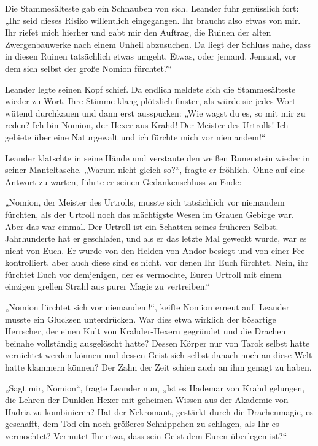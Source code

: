 \documentclass[10pt, a4paper, oneside]{book}
\begin{document}
Die Stammesälteste gab ein Schnauben von sich. Leander fuhr genüsslich fort: „Ihr seid dieses Risiko willentlich eingegangen. Ihr braucht also etwas von mir. Ihr riefet mich hierher und gabt mir den Auftrag, die Ruinen der alten Zwergenbauwerke nach einem Unheil abzusuchen. Da liegt der Schluss nahe, dass in diesen Ruinen tatsächlich etwas umgeht. Etwas, oder jemand. Jemand, vor dem sich selbst der große Nomion fürchtet?“

Leander legte seinen Kopf schief. Da endlich meldete sich die Stammesälteste wieder zu Wort. Ihre Stimme klang plötzlich finster, als würde sie jedes Wort wütend durchkauen und dann erst ausspucken: „Wie wagst du es, so mit mir zu reden? Ich bin Nomion, der Hexer aus Krahd! Der Meister des Urtrolls! Ich gebiete über eine Naturgewalt und ich fürchte mich vor niemandem!“

Leander klatschte in seine Hände und verstaute den weißen Runenstein wieder in seiner Manteltasche. „Warum nicht gleich so?“, fragte er fröhlich. Ohne auf eine Antwort zu warten, führte er seinen Gedankenschluss zu Ende:

„Nomion, der Meister des Urtrolls, musste sich tatsächlich vor niemandem fürchten, als der Urtroll noch das mächtigste Wesen im Grauen Gebirge war. Aber das war einmal. Der Urtroll ist ein Schatten seines früheren Selbst. Jahrhunderte hat er geschlafen, und als er das letzte Mal geweckt wurde, war es nicht von Euch. Er wurde von den Helden von Andor besiegt und von einer Fee kontrolliert, aber auch diese sind es nicht, vor denen Ihr Euch fürchtet. Nein, ihr fürchtet Euch vor demjenigen, der es vermochte, Euren Urtroll mit einem einzigen grellen Strahl aus purer Magie zu vertreiben.“

„Nomion fürchtet sich vor niemandem!“, keifte Nomion erneut auf. Leander musste ein Glucksen unterdrücken. War dies etwa wirklich der bösartige Herrscher, der einen Kult von Krahder-Hexern gegründet und die Drachen beinahe vollständig ausgelöscht hatte? Dessen Körper nur von Tarok selbst hatte vernichtet werden können und dessen Geist sich selbst danach noch an diese Welt hatte klammern können? Der Zahn der Zeit schien auch an ihm genagt zu haben.

„Sagt mir, Nomion“, fragte Leander nun, „Ist es Hademar von Krahd gelungen, die Lehren der Dunklen Hexer mit geheimen Wissen aus der Akademie von Hadria zu kombinieren? Hat der Nekromant, gestärkt durch die Drachenmagie, es geschafft, dem Tod ein noch größeres Schnippchen zu schlagen, als Ihr es vermochtet? Vermutet Ihr etwa, dass sein Geist dem Euren überlegen ist?“
\end{document}
